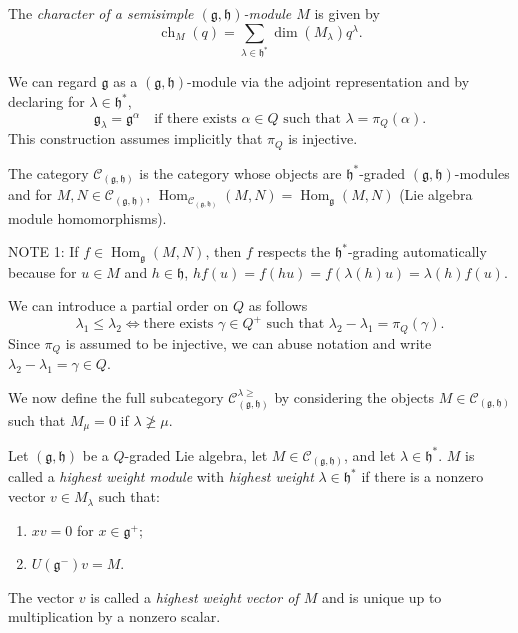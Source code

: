 \documentclass[a4paper, 12pt, reqno]{amsart}
\DeclareMathOperator{\ch}{ch}
\DeclareMathOperator{\Hom}{Hom}
\begin{document}
The \emph{character of a semisimple $(\mathfrak{g}, \mathfrak{h})$-module $M$} is given by
\begin{equation*}
  \ch_M(q) = \sum_{\lambda \in \mathfrak{h}^*}\dim(M_{\lambda})q^{\lambda}.
\end{equation*}

We can regard $\mathfrak{g}$ as a $(\mathfrak{g}, \mathfrak{h})$-module via the adjoint representation and by declaring for $\lambda \in \mathfrak{h}^*$,
\begin{equation*}
  \mathfrak{g}_{\lambda} = \mathfrak{g}^{\alpha} \quad \text{if there exists $\alpha \in Q$ such that $\lambda = \pi_Q(\alpha)$}.
\end{equation*}
This construction assumes implicitly that $\pi_Q$ is injective.

The category $\mathcal{C}_{(\mathfrak{g}, \mathfrak{h})}$ is the category whose objects are $\mathfrak{h}^*$-graded $(\mathfrak{g}, \mathfrak{h})$-modules and for $M, N \in \mathcal{C}_{(\mathfrak{g}, \mathfrak{h})}$, $\Hom_{\mathcal{C}_{(\mathfrak{g}, \mathfrak{h})}}(M, N) = \Hom_{\mathfrak{g}}(M, N)$ (Lie algebra module homomorphisms).

NOTE 1: If $f \in \Hom_{\mathfrak{g}}(M, N)$, then $f$ respects the $\mathfrak{h}^*$-grading automatically because for $u \in M$ and $h \in \mathfrak{h}$, $hf(u) = f(hu) = f(\lambda(h)u) = \lambda(h)f(u)$.

We can introduce a partial order on $Q$ as follows
\begin{equation*}
  \lambda_1 \le \lambda_2 \iff \text{there exists $\gamma \in Q^+$ such that $\lambda_2 - \lambda_1 = \pi_Q(\gamma)$.}
\end{equation*}
Since $\pi_Q$ is assumed to be injective, we can abuse notation and write $\lambda_2 - \lambda_1 = \gamma \in Q$.

We now define the full subcategory $\mathcal{C}^{\lambda \ge}_{(\mathfrak{g}, \mathfrak{h})}$ by considering the objects $M \in \mathcal{C}_{(\mathfrak{g}, \mathfrak{h})}$ such that $M_{\mu} = 0$ if $\lambda \ngeq \mu$.

Let $(\mathfrak{g}, \mathfrak{h})$ be a $Q$-graded Lie algebra, let $M \in \mathcal{C}_{(\mathfrak{g}, \mathfrak{h})}$, and let $\lambda \in \mathfrak{h}^*$.
$M$ is called a \emph{highest weight module} with \emph{highest weight} $\lambda \in \mathfrak{h}^*$ if there is a nonzero vector $v \in M_{\lambda}$ such that:
\begin{enumerate}
\item $xv = 0$ for $x \in \mathfrak{g}^+$;
\item $U(\mathfrak{g}^-)v = M$.
\end{enumerate}
The vector $v$ is called a \emph{highest weight vector of $M$} and is unique up to multiplication by a nonzero scalar.
\end{document}
